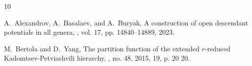 \documentclass[11pt]{amsart}
\theoremstyle{definition}
\theoremstyle{remark}
\newcommand{\<}{\left<}
\renewcommand{\>}{\right>}
\numberwithin{equation}{section}
\begin{document}
\begin{thebibliography}{10}

A.~Alexandrov, A.~Basalaev, and %
A.~Buryak,
\newblock A construction of open descendant potentials in all genera,
,
  vol. 17, pp. 14840--14889, 2023. %

M.~Bertola and %
D.~Yang,
\newblock The partition function of the extended {$r$}-reduced
  {K}adomtsev-{P}etviashvili hierarchy,
, no. 48, 2015, 19, p. 20 20.


\end{thebibliography}
\end{document}

